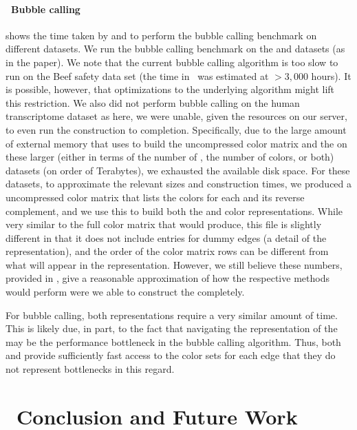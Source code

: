 \paragraph*{~Bubble calling}  shows the time taken by \rainbowfish and \vari to perform the bubble
calling benchmark on different datasets. We run the bubble calling benchmark on
the \ecoli and \plant datasets (as in the \vari paper). We note that the current
bubble calling algorithm is too slow to run on the Beef safety data set (the
time in~\cite{MuggliBoNo17} was estimated at $>3,000$ hours). It is possible,
however, that optimizations to the underlying algorithm might lift this
restriction. We also did not perform bubble calling on the human transcriptome
dataset as here, we were unable, given the resources on our server, to even run
the \dbg construction to completion. Specifically, due to the large amount of
external memory that \vari uses to build the uncompressed color matrix and the
\dbg on these larger (either in terms of the number of \kmers, the number of
colors, or both) datasets (on order of Terabytes), we exhausted the available
disk space. For these datasets, to approximate the relevant sizes and
construction times, we produced a uncompressed color matrix that lists the
colors for each \kmer and its reverse complement, and we use this to build both
the \vari and \rainbowfish color representations. While very similar to the full color
matrix that \vari would produce, this file is slightly different in that it does
not include entries for dummy edges (a detail of the \boss representation), and
the order of the color matrix rows can be different from what will appear in the
\boss representation. However, we still believe these numbers, provided in
, give a reasonable approximation of how the respective
methods would perform were we able to construct the \dbg completely.

For bubble calling, both representations require a very similar amount of time.
This is likely due, in part, to the fact that navigating the \boss
representation of the \dbg may be the performance bottleneck in the bubble
calling algorithm. Thus, both \vari and \rainbowfish provide sufficiently fast access
to the color sets for each edge that they do not represent bottlenecks in this
regard.

\section{~Conclusion and Future Work}
\label{sec:conclusion}

